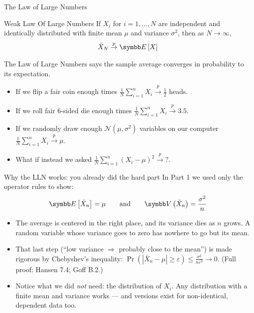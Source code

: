 \documentclass[aspectratio=169,11pt]{beamer}
\begin{document}
\begin{frame}{The Law of Large Numbers}
\begin{center}
\begin{minipage}{.8\textwidth}
	\begin{block}{Weak Law Of Large Numbers}
\vspace{0.3cm}
		If $X_i$ for $i=1,\dots,N$ are \alert{independent and identically distributed} with finite mean $\mu$ and variance $\sigma^2$,
		then as $N\rightarrow \infty$,\[
			\bar{X}_N \overset{p}{\rightarrow} \E\left[X\right]
		\]
	\end{block}
\end{minipage}
\end{center}
The Law of Large Numbers says the sample average converges in probability to its expectation.
\begin{itemize}
\item If we flip a fair coin enough times $\frac{1}{N}\sum_{i=1}^n X_i \overset{p}{\to} \frac{1}{2}$ heads.
\item If we roll fair 6-sided die enough times $\frac{1}{N}\sum_{i=1}^n X_i \overset{p}{\to} 3.5$.
\item If we randomly draw enough $\mathcal{N}(\mu,\sigma^2)$ variables on our computer $\frac{1}{N}\sum_{i=1}^n X_i \overset{p}{\to} \mu$.
\item What if instead we asked $\frac{1}{N}\sum_{i=1}^n (X_i -\mu)^2 \overset{p}{\to} ?$.
\end{itemize}
\end{frame}


\begin{frame}{Why the LLN works: you already did the hard part}
In Part 1 we used \alert{only the operator rules} to show:
\begin{align*}
\E\left[\bar{X}_n\right] = \mu \qquad \text{and} \qquad \Var\left(\bar{X}_n\right) = \frac{\sigma^2}{n}
\end{align*}
\begin{itemize}
	\item The average is \alert{centered in the right place}, and its \alert{variance dies} as $n$ grows.
	A random variable whose variance goes to zero has nowhere to go but its mean.

	\medskip
	\item That last step (``low variance $\Rightarrow$ probably close to the mean'') is
	made rigorous by \alert{Chebyshev's inequality}:
	$\Pr\left(|\bar{X}_n - \mu| \geq \varepsilon\right) \leq \frac{\sigma^2}{n\varepsilon^2} \rightarrow 0$.
	(Full proof: Hansen 7.4; Goff B.2.)

	\medskip
	\item Notice what we did \emph{not} need: the distribution of $X_i$. Any distribution
	with a finite mean and variance works --- and versions exist for non-identical,
	dependent data too.
\end{itemize}
\end{frame}
\end{document}
